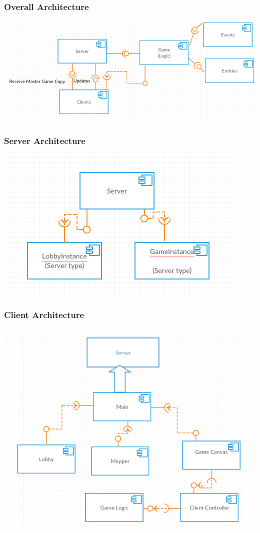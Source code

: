 \documentclass{beamer}
\begin{document}
\begin{frame}
\frametitle{Overall Architecture}
\centering
\includegraphics[scale=0.4]{images/overall_architecture.png}
\end{frame}

\begin{frame}
\frametitle{Server Architecture}
\centering
\includegraphics[scale=0.7]{images/ServerArchitecture.png}
\end{frame}

\begin{frame}
\frametitle{Client Architecture}
\centering
\includegraphics[scale=0.4]{images/ClientArchitecture.png}
\end{frame}
\end{document}
